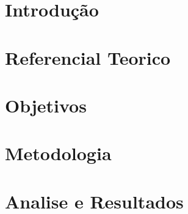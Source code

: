 \documentclass[12pt,twoside,a4paper,brazilian]{article}
\begin{document}
\graphicspath{ {ac/img/} }
\newpage

\listoftables
\newpage

\listoffigures
\newpage



\tableofcontents

\blankpage
\newpage

\section{Introdução}

\newpage

\blankpage
\newpage

\section{Referencial Teorico}

\newpage

\blankpage
\newpage

\section{Objetivos}

\newpage

\blankpage
\newpage

\section{Metodologia}

\newpage  

\blankpage
\newpage

\section{Analise e Resultados}

\newpage
\end{document}
